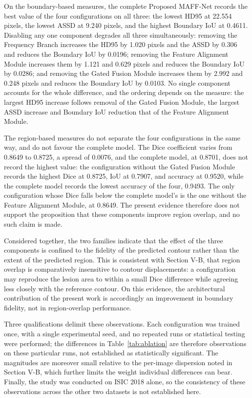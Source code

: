 On the boundary-based measures, the complete Proposed MAFF-Net records the best value of the four configurations on all three: the lowest HD95 at 22.554 pixels, the lowest ASSD at 9.240 pixels, and the highest Boundary IoU at 0.4611. Disabling any one component degrades all three simultaneously: removing the Frequency Branch increases the HD95 by 1.020 pixels and the ASSD by 0.306 and reduces the Boundary IoU by 0.0196; removing the Feature Alignment Module increases them by 1.121 and 0.629 pixels and reduces the Boundary IoU by 0.0286; and removing the Gated Fusion Module increases them by 2.992 and 0.248 pixels and reduces the Boundary IoU by 0.0103. No single component accounts for the whole difference, and the ordering depends on the measure: the largest HD95 increase follows removal of the Gated Fusion Module, the largest ASSD increase and Boundary IoU reduction that of the Feature Alignment Module.

The region-based measures do not separate the four configurations in the same way, and do not favour the complete model. The Dice coefficient varies from 0.8649 to 0.8725, a spread of 0.0076, and the complete model, at 0.8701, does not record the highest value: the configuration without the Gated Fusion Module records the highest Dice at 0.8725, IoU at 0.7907, and accuracy at 0.9520, while the complete model records the lowest accuracy of the four, 0.9493. The only configuration whose Dice falls below the complete model's is the one without the Feature Alignment Module, at 0.8649. The present evidence therefore does not support the proposition that these components improve region overlap, and no such claim is made.

Considered together, the two families indicate that the effect of the three components is confined to the fidelity of the predicted contour rather than the extent of the predicted region. This is consistent with Section V-B, that region overlap is comparatively insensitive to contour displacements: a configuration may reproduce the lesion area to within a small Dice difference while agreeing less closely with the reference contour. On this evidence, the architectural contribution of the present work is accordingly an improvement in boundary fidelity, not in region-overlap performance.

Three qualifications delimit these observations. Each configuration was trained once, with a single experimental seed, and no repeated runs or statistical testing were performed; the differences in Table~\ref{tab:ablation} are therefore observations on these particular runs, not established as statistically significant. The magnitudes are moreover small relative to the per-image dispersion noted in Section V-B, which further limits the weight individual differences can bear. Finally, the study was conducted on ISIC 2018 alone, so the consistency of these observations across the other two datasets is not established here.

